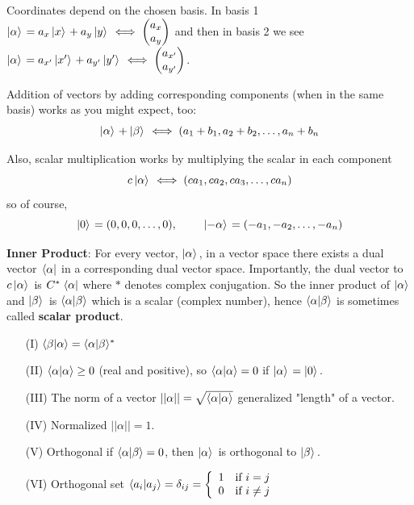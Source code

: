 \documentclass[english, 11pt]{article}
\begin{document}
        Coordinates depend on the chosen basis. In basis 1 $\left| \alpha \rangle \right. = a_x\left| x \rangle \right. + a_y\left| y \rangle \right. \iff \left(\begin{matrix}a_x \\ a_y \end{matrix}\right)$ and then in basis 2 we see $\left| \alpha \rangle \right. = a_{x'}\left| x' \rangle \right. + a_{y'}\left| y' \rangle \right. \iff \left(\begin{matrix}a_{x'} \\ a_{y'}\end{matrix}\right)$. \newline

        Addition of vectors by adding corresponding components (when in the same basis) works as you might expect, too:
        \[ \left| \alpha \rangle \right. + \left| \beta \rangle \right. \iff (a_1 + b_1, a_2 + b_2, \hdots, a_n + b_n \]

        Also, scalar multiplication works by multiplying the scalar in each component
        \[ c\left| \alpha \rangle \right. \iff (ca_1, ca_2, ca_3, \ldots, ca_n) \]
        so of course,
        \[ \ket{0} = (0, 0, 0, \ldots, 0),  \ \ \ \ \ \ \  \ket{-\alpha} = (-a_1, -a_2, \ldots, -a_n) \]

        {\bf Inner Product}: For every vector, $\left| \alpha \rangle \right.$, in a vector space there exists a dual vector $\left. \langle \alpha \right|$ in a corresponding dual vector space. Importantly, the dual vector to $c\left| \alpha \rangle \right.$ is $C^*\left. \langle \alpha \right|$ where $*$ denotes complex conjugation. So the inner product of $\left| \alpha \rangle \right.$ and $\left| \beta \rangle \right.$ is $\langle \alpha | \beta \rangle$ which is a scalar (complex number), hence $\langle \alpha | \beta \rangle$ is sometimes called {\bf scalar product}.

        \begin{itemize}
          \item[(I)] $\langle \beta | \alpha \rangle = \langle \alpha | \beta \rangle^*$
          \item[(II)] $\langle \alpha | \alpha \rangle \geq 0$ (real and positive), so $\langle \alpha | \alpha \rangle = 0$ if $\left| \alpha \rangle \right. = \left| 0 \rangle \right.$.
          \item[(III)] The norm of a vector $||\alpha|| = \sqrt{\langle \alpha | \alpha \rangle}$ generalized "length" of a vector.
          \item[(IV)] Normalized $||\alpha|| = 1$.
          \item[(V)] Orthogonal if $\langle \alpha | \beta \rangle = 0$, then $\left| \alpha \rangle \right.$ is orthogonal to $\left| \beta \rangle \right.$.
          \item[(VI)] Orthogonal set $\langle a_i | a_j \rangle = \delta_{ij} = \left\{ \begin{array}{lr} 1 & \mbox{if $i = j$} \\ 0 & \mbox{if $i \not = j$} \end{array} \right.$
        \end{itemize}
\end{document}
